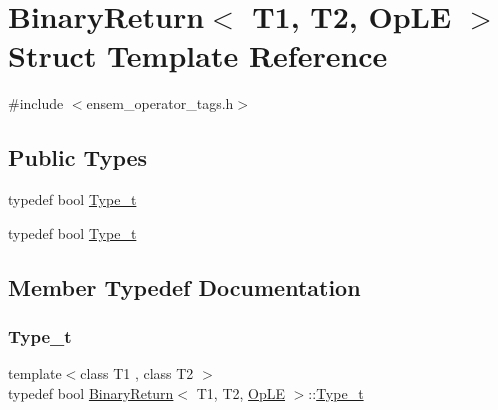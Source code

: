\hypertarget{structBinaryReturn_3_01T1_00_01T2_00_01OpLE_01_4}{}\section{Binary\+Return$<$ T1, T2, Op\+LE $>$ Struct Template Reference}
\label{structBinaryReturn_3_01T1_00_01T2_00_01OpLE_01_4}


{\ttfamily \#include $<$ensem\+\_\+operator\+\_\+tags.\+h$>$}

\subsection*{Public Types}
\begin{DoxyCompactItemize}
\item 
typedef bool \mbox{\hyperlink{structBinaryReturn_3_01T1_00_01T2_00_01OpLE_01_4_a97477e4d06d79977296f86c374a5bc1e}{Type\+\_\+t}}
\item 
typedef bool \mbox{\hyperlink{structBinaryReturn_3_01T1_00_01T2_00_01OpLE_01_4_a97477e4d06d79977296f86c374a5bc1e}{Type\+\_\+t}}
\end{DoxyCompactItemize}


\subsection{Member Typedef Documentation}
\mbox{\label{structBinaryReturn_3_01T1_00_01T2_00_01OpLE_01_4_a97477e4d06d79977296f86c374a5bc1e}} 
\subsubsection{\texorpdfstring{Type\_t}{Type\_t}\hspace{0.1cm}{\footnotesize\ttfamily [1/2]}}
{\footnotesize\ttfamily template$<$class T1 , class T2 $>$ \\
typedef bool \mbox{\hyperlink{structBinaryReturn}{Binary\+Return}}$<$ T1, T2, \mbox{\hyperlink{structOpLE}{Op\+LE}} $>$\+::\mbox{\hyperlink{structBinaryReturn_3_01T1_00_01T2_00_01OpLE_01_4_a97477e4d06d79977296f86c374a5bc1e}{Type\+\_\+t}}}

\mbox{\label{structBinaryReturn_3_01T1_00_01T2_00_01OpLE_01_4_a97477e4d06d79977296f86c374a5bc1e}} 
